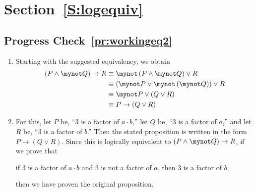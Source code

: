 \section*{Section~\ref{S:logequiv}}

\subsection*{Progress Check~\ref{pr:workingeq2}}
\begin{enumerate}
\item Starting with the suggested equivalency, we obtain 
\begin{align*}
\left( {P \wedge \mynot  Q} \right) \to R &\equiv \mynot \left( P \wedge \mynot Q \right) \vee R \\
                  &\equiv \left( \mynot P \vee \mynot \left( \mynot Q \right) \right) \vee R \\
                  &\equiv \mynot P \vee \left( Q \vee R \right) \\
                  &\equiv P \to \left( Q \vee R \right)
\end{align*}
\item For this, let  $P$  be, ``3 is a factor of  $a \cdot b$,'' let  $Q$  be, ``3 is a factor of  $a$,'' and let  $R$  be, ``3 is a factor of  $b$.''  Then the stated proposition is written in the form  $P \to \left( {Q \vee R} \right)$.  Since this is logically equivalent to  
$\left( {P \wedge \mynot  Q} \right) \to R$, if we prove that

\begin{center}
if  3  is a factor of   $a \cdot b$ and  3  is not a factor of   $a$, then  3  is a factor of $b$,
\end{center}

then we have proven the original proposition.
\end{enumerate}
\hbreak

\endinput
